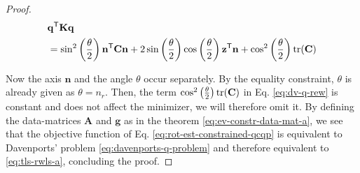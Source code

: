 \begin{proof}
	\begin{equation}
		\label{eq:dv-q-rew}
		\begin{aligned}
			&\mathbf{q}^{\mathsf{T}} \mathbf{K} \mathbf{q}\\
			&= \sin^2 \left(\frac{\theta}{2} \right) \mathbf{n}^{\mathsf{T}} \mathbf{C} \mathbf{n} + 2 \sin \left(\frac{\theta}{2} \right) \cos \left(\frac{\theta}{2} \right) \mathbf{z}^{\mathsf{T}} \mathbf{n} + \cos^2 \left(\frac{\theta}{2} \right) \textrm{tr}(\mathbf{C})
		\end{aligned}
	\end{equation}
	
	Now the axis $\mathbf{n}$ and the angle $\theta$ occur separately. 
	By the equality constraint, $\theta$ is already given as $\theta = n_r$. Then, the term $ \cos^2 \left(\frac{\theta}{2} \right) \textrm{tr}(\mathbf{C})$ in Eq. \ref{eq:dv-q-rew} is constant and does not affect the minimizer, we will therefore omit it. 
	 By defining the data-matrices $\mathbf{A}$ and $\mathbf{g}$ as in the theorem \ref{eq:ev-constr-data-mat-a}, we see that the objective function of Eq. \ref{eq:rot-est-constrained-qcqp} is equivalent to Davenports' problem \ref{eq:davenports-q-problem} and therefore equivalent to \ref{eq:tls-rwls-a}, concluding the proof.
\end{proof}	


